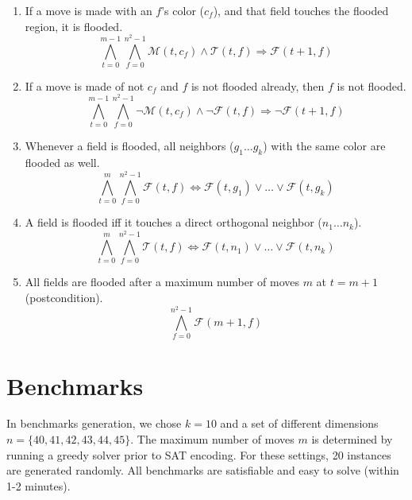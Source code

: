 \documentclass[conference]{IEEEtran}
\newcommand{\nMoves}{\ensuremath{m}\xspace}
\newcommand{\bSize}{\ensuremath{n}\xspace}
\newcommand{\clr}{\ensuremath{c}\xspace}
\newcommand{\nColors}{\ensuremath{k}\xspace}
\newcommand{\flood}[2]{\ensuremath{\mathcal{F}(#1,#2)}\xspace}
\newcommand{\move}[2]{\ensuremath{\mathcal{M}(#1,#2)}\xspace}
\newcommand{\touch}[2]{\ensuremath{\mathcal{T}(#1,#2)}\xspace}
\newcommand{\turn}{\ensuremath{t}\xspace}
\newcommand{\field}{\ensuremath{f}\xspace}
\begin{document}
\begin{enumerate}
	\item If a move is made with an \field's color ($\clr_\field$), and that field touches the flooded region, it is flooded.
	\begin{equation}
	\bigwedge_{\turn=0}^{\nMoves-1}
	\bigwedge_{\field=0}^{{\bSize^2}-1}
	\move{\turn}{\clr_\field}\wedge\touch{\turn}{\field}\Rightarrow\flood{\turn+1}{\field}
	\end{equation}
	\item If a move is made of not  $\clr_\field$ and \field is not flooded already, then \field is not flooded.
	\begin{equation}
	\bigwedge_{\turn=0}^{\nMoves-1}
	\bigwedge_{\field=0}^{{\bSize^2}-1}
	\neg\move{\turn}{\clr_\field}\wedge\neg\flood{\turn}{\field}\Rightarrow\neg\flood{\turn+1}{\field}
	\end{equation}
	\item Whenever a field is flooded, all neighbors ($g_1\dots g_k$) with the same color are flooded as well.
	\begin{equation}
	\bigwedge_{\turn=0}^{\nMoves}
	\bigwedge_{\field=0}^{{\bSize^2}-1}
	\flood{\turn}{\field}\Leftrightarrow\flood{\turn}{g_1}\vee\dots\vee\flood{\turn}{g_k}
	\end{equation} 
	\item A field is flooded iff it touches a direct orthogonal neighbor ($\bSize_1\dots \bSize_k$).
	\begin{equation}
	\bigwedge_{\turn=0}^{\nMoves}
	\bigwedge_{\field=0}^{{\bSize^2}-1}
	\touch{\turn}{\field}\Leftrightarrow\flood{\turn}{n_1}\vee\dots\vee\flood{\turn}{n_k}
	\end{equation} 
	\item All fields are flooded after a maximum number of moves \nMoves at $\turn=\nMoves+1$ (postcondition).
	\begin{equation}
	\bigwedge_{\field=0}^{{\bSize^2}-1}
	\flood{\nMoves+1}{\field}
	\end{equation} 
\end{enumerate}
\section{Benchmarks}
In benchmarks generation, we chose $\nColors=10$ and a set of different dimensions $n=\{40,41,42,43,44,45\}$. The maximum number of moves \nMoves is determined by running a greedy solver prior to SAT encoding. For these settings, 20 instances are generated randomly. All benchmarks are satisfiable and easy to solve (within 1-2 minutes).


\end{document}
